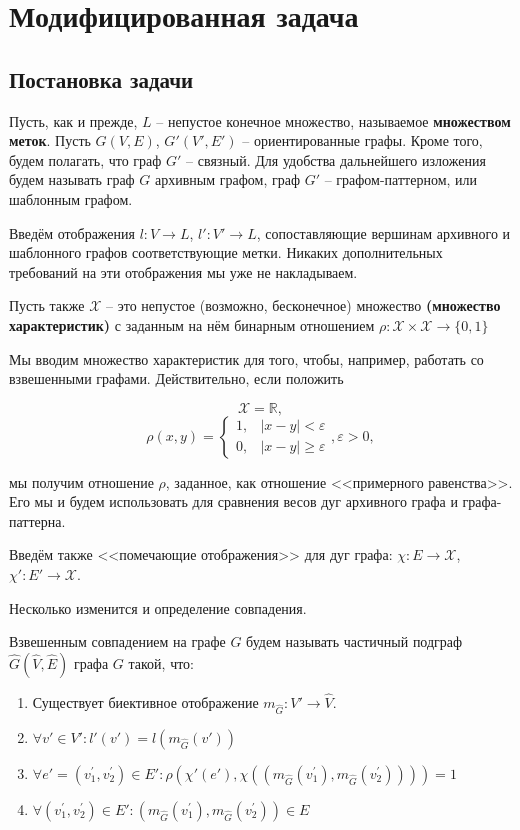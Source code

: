 \section{Модифицированная задача}

\subsection{Постановка задачи}
\par Пусть, как и прежде, $L$ -- непустое конечное множество, называемое \textbf{множеством меток}. Пусть $G(V, E)$, $G'(V', E')$ -- ориентированные графы. Кроме того, будем полагать, что граф $G'$ -- связный. Для удобства дальнейшего изложения будем называть граф $G$ архивным графом, граф $G'$ -- графом-паттерном, или шаблонным графом.

Введём отображения $l : V \to L$, $l' : V' \to L$, сопоставляющие вершинам архивного и шаблонного графов соответствующие метки. Никаких дополнительных требований на эти отображения мы уже не накладываем.

Пусть также $\mathcal{X}$ -- это непустое (возможно, бесконечное) множество \textbf{(множество характеристик)} с заданным на нём бинарным отношением $\rho:\mathcal{X} \times \mathcal{X} \to \{0, 1\}$

Мы вводим множество характеристик для того, чтобы, например, работать со взвешенными графами. Действительно, если положить 

\[\mathcal{X} = \mathbb{R},\]
\[\rho(x, y) = \begin{cases}
1, & |x - y| < \varepsilon \\
0, & |x - y| \ge \varepsilon
\end{cases}, \varepsilon > 0,\]

мы получим отношение $\rho$, заданное, как отношение <<примерного равенства>>. Его мы и будем использовать для сравнения весов дуг архивного графа и графа-паттерна.

Введём также <<помечающие отображения>> для дуг графа: $\chi : E \to \mathcal{X}$, $\chi' : E' \to \mathcal{X}$.

Несколько изменится и определение совпадения.

\begin{defn}
	Взвешенным совпадением на графе $G$ будем называть частичный подграф $\widehat{G}(\widehat{V}, \widehat{E})$ графа $G$ такой, что:
	\begin{enumerate}
		\item Существует биективное отображение $m_{\widehat{G}}: V' \to \widehat{V}$.
		\item $\forall v' \in V': l'(v') = l(m_{\widehat{G}}(v'))$
		\item $\forall e' = (v^{\prime}_1, v^{\prime}_2) \in E': \rho(\chi'(e'), \chi((m_{\widehat{G}}(v^{\prime}_1), m_{\widehat{G}}(v^{\prime}_2)))) = 1$
		\item $\forall (v^{\prime}_1, v^{\prime}_2) \in E': (m_{\widehat{G}}(v^{\prime}_1), m_{\widehat{G}}(v^{\prime}_2)) \in E$
	\end{enumerate}
\end{defn} 


